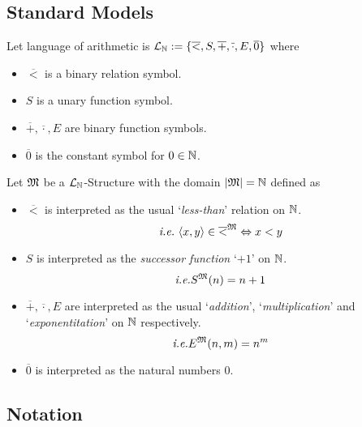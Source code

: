 \documentclass[11pt,a4paper]{article}
\begin{document}
\subsection{Standard Models}

Let language of arithmetic is $\mathcal{L}_{\mathbb{N}}:=\{\overline<,S,\overline+,\overline\cdot,E,\overline0\}$ where
\begin{itemize}
	\item $\overline<$ is a binary relation symbol.
	\item $S$ is a unary function symbol.
	\item $\overline+,\overline\cdot,E$ are binary function symbols.
	\item $\overline0$ is the constant symbol for $0\in\mathbb{N}$.
\end{itemize}
Let $\mathfrak{M}$ be a $\mathcal{L}_{\mathbb{N}}$-Structure with the domain $|\mathfrak{M}|=\mathbb{N}$ defined as
\begin{itemize}
	\item $\overline<$ is interpreted as the usual `\textit{less-than}' relation on $\mathbb{N}$.
	$$\ie\ \langle x,y\rangle\in\overline<^\M\Leftrightarrow x<y$$
	\item $S$ is interpreted as the \textit{successor function} `$+1$' on $\mathbb{N}$.
	$$\textit{i.e.} S^{\mathfrak{M}}(n)=n+1$$
	\item $\overline+,\overline\cdot,E$ are interpreted as the usual `\textit{addition}', `\textit{multiplication}' and `\textit{exponentitation}' on $\mathbb{N}$ respectively.
	$$\textit{i.e.} E^{\mathfrak{M}}(n,m)=n^m$$
	\item $\overline0$ is interpreted as the natural numbers $0$.
\end{itemize}

\subsection{Notation}
\end{document}
